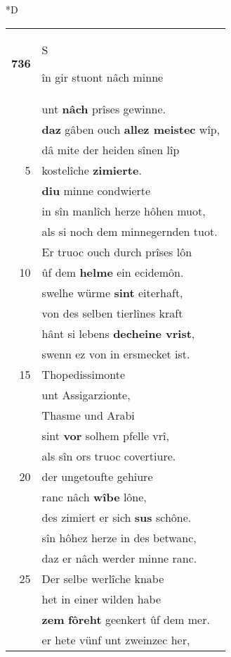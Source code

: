\documentclass[8pt,a4paper,notitlepage]{article}
\begin{document}
\begin{table}[ht]
\begin{minipage}[t]{0.5\linewidth}
\small
\begin{center}*D
\end{center}
\begin{tabular}{rl}
\textbf{736} & \begin{large}S\end{large}în gir stuont nâch minne\\ 
 & unt \textbf{nâch} prîses gewinne.\\ 
 & \textbf{daz} gâben ouch \textbf{allez meistec} wîp,\\ 
 & dâ mite der heiden sînen lîp\\ 
5 & kostelîche \textbf{zimierte}.\\ 
 & \textbf{diu} minne condwierte\\ 
 & in sîn manlîch herze hôhen muot,\\ 
 & als si noch dem minnegernden tuot.\\ 
 & Er truoc ouch durch prîses lôn\\ 
10 & ûf dem \textbf{helme} ein ecidemôn.\\ 
 & swelhe würme \textbf{sint} eiterhaft,\\ 
 & von des selben tierlînes kraft\\ 
 & hânt si lebens \textbf{decheine vrist},\\ 
 & swenn ez von in ersmecket ist.\\ 
15 & Thopedissimonte\\ 
 & unt Assigarzionte,\\ 
 & Thasme und Arabi\\ 
 & sint \textbf{vor} solhem pfelle vrî,\\ 
 & als sîn ors truoc covertiure.\\ 
20 & der ungetoufte gehiure\\ 
 & ranc nâch \textbf{wîbe} lône,\\ 
 & des zimiert er sich \textbf{sus} schône.\\ 
 & sîn hôhez herze in des betwanc,\\ 
 & daz er nâch werder minne ranc.\\ 
25 & Der selbe werlîche knabe\\ 
 & het in einer wilden habe\\ 
 & \textbf{zem} \textbf{fôreht} geenkert ûf dem mer.\\ 
 & er hete vünf unt zweinzec her,\\ 

\end{tabular}
\end{minipage}
\end{table}
\end{document}
